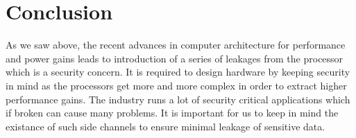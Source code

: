 \documentclass[twoside]{iitbreport}
\begin{document}


%

%

\figurespagefalse
\tablespagefalse
\makecontents %


\cleardoublepage
\setcounter{page}{1}


%
%
%

\chapter{Conclusion}

As we saw above, the recent advances in computer architecture for performance and power gains
leads to introduction of a series of leakages from the processor which is a security concern.
It is required to design hardware by keeping security in mind as the processors get more and more
complex in order to extract higher performance gains. The industry runs a lot of security 
critical applications which if broken can cause many problems. It is important for us to
keep in mind the existance of such side channels to ensure minimal leakage of sensitive data.
\end{document}
